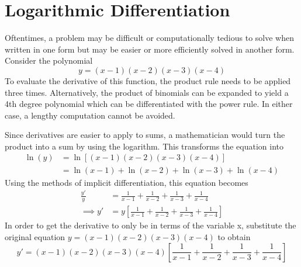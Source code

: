 \documentclass[12pt, letterpaper]{article}
\begin{document}
\section{Logarithmic Differentiation}
Oftentimes, a problem may be difficult or computationally tedious to solve when written in one form but may be easier or more efficiently solved in another form. Consider the polynomial \[y = (x-1)(x-2)(x-3)(x-4)\] To evaluate the derivative of this function, the product rule needs to be applied three times. Alternatively, the product of binomials can be expanded to yield a 4th degree polynomial which can be differentiated with the power rule. In either case, a lengthy computation cannot be avoided. 

Since derivatives are easier to apply to sums, a mathematician would turn the product  into a sum by using the logarithm. This transforms the equation into 
\begin{align*}
\ln(y) &= \ln\left[(x-1)(x-2)(x-3)(x-4)\right] \\
&= \ln(x-1) + \ln(x-2) + \ln(x-3) + \ln(x-4)
\end{align*}
Using the methods of implicit differentiation, this equation becomes
\begin{align*}
\frac{y'}{y} &= \frac{1}{x-1} + \frac{1}{x-2} + \frac{1}{x-3} + \frac{1}{x-4} \\
\implies y' &= y\left[\frac{1}{x-1} + \frac{1}{x-2} + \frac{1}{x-3} + \frac{1}{x-4}\right]
\end{align*}
In order to get the derivative to only be in terms of the variable x, substitute the original equation $y = (x-1)(x-2)(x-3)(x-4)$ to obtain \[y' = (x-1)(x-2)(x-3)(x-4)\left[\frac{1}{x-1} + \frac{1}{x-2} + \frac{1}{x-3} + \frac{1}{x-4}\right]\]
\end{document}
